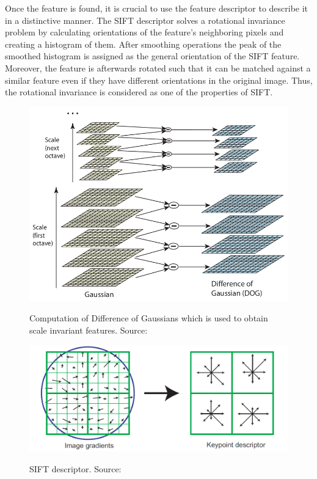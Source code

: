 Once the feature is found, it is crucial to use the feature descriptor to describe it in a distinctive manner.  The SIFT descriptor solves a rotational invariance problem by calculating orientations of the feature's neighboring pixels and creating a histogram of them. After smoothing operations the peak of the smoothed histogram is assigned as the general orientation of the SIFT feature. Moreover, the feature is afterwards rotated such that it can be matched against a similar feature even if they have different orientations in the original image. Thus, the rotational invariance is considered as one of the properties of SIFT.

\begin{figure}
\centering

{\includegraphics[width=0.8\columnwidth]{figures/dog.png}}

\caption{Computation of Difference of Gaussians which is used to obtain scale invariant features. Source:~\cite{lowe2004distinctive}}
\label{fig:dog}
\end{figure}


\begin{figure}
\centering

{\includegraphics[width=0.8\columnwidth]{figures/sift.png}}

\caption{SIFT descriptor. Source:~\cite{lowe2004distinctive}}
\label{fig:sift}
\end{figure}

